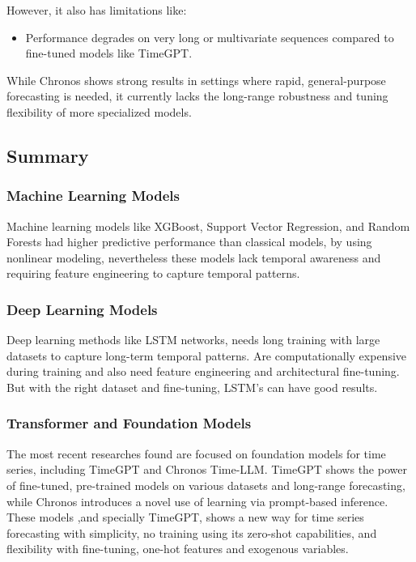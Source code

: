 \documentclass{article}
\begin{document}
However, it also has limitations like:

\begin{itemize}
    \item Performance degrades on very long or multivariate sequences compared to fine-tuned models like TimeGPT.
\end{itemize}

While Chronos shows strong results in settings where rapid, general-purpose forecasting is needed, it currently lacks the long-range robustness and tuning flexibility of more specialized models.

\subsection{Summary}
\subsubsection{Machine Learning Models}
Machine learning models like XGBoost, Support Vector Regression, and Random Forests had higher predictive performance than classical models, by using nonlinear modeling, nevertheless these models lack temporal awareness and requiring feature engineering to capture temporal patterns.

\subsubsection{Deep Learning Models}
Deep learning methods like LSTM networks, needs long training with large datasets to capture long-term temporal patterns. Are computationally expensive during training and also need feature engineering and architectural fine-tuning. But with the right dataset and fine-tuning, LSTM's can have good results.

\subsubsection{Transformer and Foundation Models}
The most recent researches found are focused on foundation models for time series, including TimeGPT and Chronos Time-LLM. TimeGPT shows the power of fine-tuned, pre-trained models on various datasets and long-range forecasting, while Chronos introduces a novel use of learning via prompt-based inference. These models ,and specially TimeGPT, shows a new way for time series forecasting with simplicity, no training using its zero-shot capabilities, and flexibility with fine-tuning, one-hot
features and exogenous variables.
\end{document}
